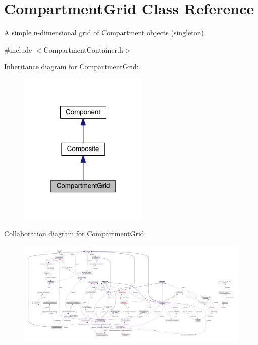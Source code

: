 \hypertarget{classCompartmentGrid}{\section{Compartment\+Grid Class Reference}
\label{classCompartmentGrid}
}


A simple n-\/dimensional grid of \hyperlink{classCompartment}{Compartment} objects (singleton).  




{\ttfamily \#include $<$Compartment\+Container.\+h$>$}



Inheritance diagram for Compartment\+Grid\+:\nopagebreak
\begin{figure}[H]
\begin{center}
\leavevmode
\includegraphics[width=175pt]{classCompartmentGrid__inherit__graph}
\end{center}
\end{figure}


Collaboration diagram for Compartment\+Grid\+:
\nopagebreak
\begin{figure}[H]
\begin{center}
\leavevmode
\includegraphics[width=350pt]{classCompartmentGrid__coll__graph}
\end{center}
\end{figure}
